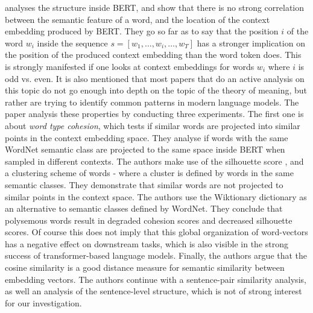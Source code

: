 \documentclass[a4paper,12pt,twoside,openright]{report}
\begin{document}
\cite{mickus19} analyses the structure inside BERT, and show that there is no strong correlation between the semantic feature of a word, and the location of the context embedding produced by BERT.
They go so far as to say that the position $i$ of the word $w_i$ inside the sequence $s = [w_1, \ldots, w_i, \ldots, w_T]$ has a stronger implication on the position of the produced context embedding than the word token does.
This is strongly manifested if one looks at context embeddings for words $w_i$ where $i$ is odd vs. even.
It is also mentioned that most papers that do an active analysis on this topic do not go enough into depth on the topic of the theory of meaning, but rather are trying to identify common patterns in modern language models.
The paper analysis these properties by conducting three experiments.
The first one is about \textit{word type cohesion}, which tests if similar words are projected into similar points in the context embedding space.
They analyse if words with the same WordNet semantic class are projected to the same space inside BERT when sampled in different contexts.
The authors make use of the silhouette score \cite{rousseeuw87}, and a clustering scheme of words - where a cluster is defined by words in the same semantic classes.
They demonstrate that similar words are not projected to similar points in the context space.
The authors use the Wiktionary dictionary \cite{wiktionary} as an alternative to  semantic classes defined by WordNet.
They conclude that polysemous words result in degraded cohesion scores and decreased silhouette scores.
Of course this does not imply that this global organization of word-vectors has a negative effect on downstream tasks, which is also visible in the strong success of transformer-based language models.
Finally, the authors argue that the cosine similarity is a good distance measure for semantic similarity between embedding vectors.
The authors continue with a sentence-pair similarity analysis, as well an analysis of the sentence-level structure, which is not of strong interest for our investigation. \\
\end{document}
